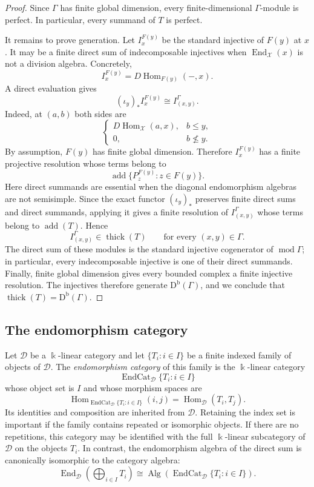 \documentclass[12pt,a4paper,english,reqno]{amsart}
\theoremstyle{plain}
\theoremstyle{definition}
\newcommand{\kk}{\Bbbk}
\newcommand{\Db}{\mathrm D^{\mathrm b}}
\newcommand{\Hom}{\operatorname{Hom}}
\newcommand{\End}{\operatorname{End}}
\newcommand{\thick}{\operatorname{thick}}
\newcommand{\add}{\operatorname{add}}
\newcommand{\X}{\mathcal X}
\newcommand{\G}{\Gamma}
\newcommand{\modu}{\operatorname{mod}}
\begin{document}
\begin{proof}
Since $\G$ has finite global dimension, every finite-dimensional
$\G$-module is perfect.  In particular, every summand of $T$ is perfect.

It remains to prove generation.  Let $I_x^{F(y)}$ be the standard injective
of $F(y)$ at $x$.  It may be a finite direct sum of indecomposable
injectives when $\End_{\X}(x)$ is not a division algebra.  Concretely,
\[
 I_x^{F(y)}=D\Hom_{F(y)}(-,x).
\]
A direct evaluation gives
\begin{equation}
 (\iota_y)_*I_x^{F(y)}
 \cong I_{(x,y)}^{\G}.
\label{eq:injective-kan}
\end{equation}
Indeed, at $(a,b)$ both sides are
\[
 \begin{cases}
 D\Hom_{\X}(a,x),&b\leq y,\\
 0,&b\nleq y.
 \end{cases}
\]
By assumption, $F(y)$ has finite global dimension.  Therefore
$I_x^{F(y)}$ has a finite projective resolution whose terms belong to
\[
 \add\{P_z^{F(y)}:z\in F(y)\}.
\]
Here direct summands are essential when the diagonal endomorphism algebras
are not semisimple.  Since the exact functor $(\iota_y)_*$ preserves finite
direct sums and direct summands, applying it gives a finite resolution of
$I_{(x,y)}^{\G}$ whose terms belong to $\add(T)$.
Hence
\[
 I_{(x,y)}^{\G}\in\thick(T)
 \qquad\text{for every }(x,y)\in\G.
\]
The direct sum of these modules is the standard injective cogenerator of
$\modu\G$; in particular, every indecomposable injective is one of their
direct summands.  Finally, finite global dimension gives every bounded
complex a finite injective resolution.  The injectives therefore generate
$\Db(\G)$, and we conclude that
$\thick(T)=\Db(\G)$.
\end{proof}

\subsection{The endomorphism category}

Let $\mathcal D$ be a $\kk$-linear category and let
$\{T_i:i\in I\}$ be a finite indexed family of objects of $\mathcal D$.
The \emph{endomorphism category} of this family is the $\kk$-linear
category
\[
 \operatorname{EndCat}_{\mathcal D}\{T_i:i\in I\}
\]
whose object set is $I$ and whose morphism spaces are
\[
 \Hom_{\operatorname{EndCat}_{\mathcal D}\{T_i:i\in I\}}(i,j)
 =
 \Hom_{\mathcal D}(T_i,T_j).
\]
Its identities and composition are inherited from $\mathcal D$. Retaining the
index set is important if the family contains repeated or isomorphic objects.
If there are no repetitions, this category may be identified with the full
$\kk$-linear subcategory of $\mathcal D$ on the objects $T_i$. In
contrast, the endomorphism algebra of the direct sum is canonically
isomorphic to the category algebra:
\begin{equation}
 \End_{\mathcal D}\!\left(\bigoplus_{i\in I}T_i\right)
 \cong
 \operatorname{Alg}\!\left(
  \operatorname{EndCat}_{\mathcal D}\{T_i:i\in I\}
 \right).
\label{eq:endcat-algebra}
\end{equation}
\end{document}
